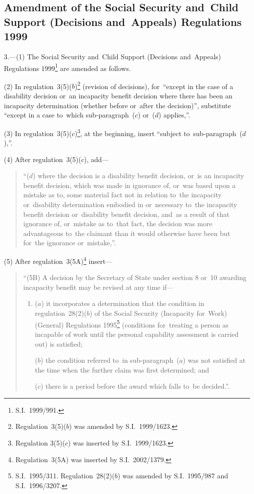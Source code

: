 \documentclass[12pt,a4paper]{article}
\begin{document}
\subsection[3. Amendment of the Social Security and~Child Support (Decisions and~Appeals) Regulations 1999]{Amendment of the Social Security and~Child Support (Decisions and~Appeals) Regulations 1999}

3.---(1)  The Social Security and~Child Support (Decisions and~Appeals) Regulations 1999\footnote{S.I.~1999/991.} are amended as follows.

(2) In regulation~3(5)($b$)\footnote{Regulation~3(5)($b$) was amended by S.I.~1999/1623.} (revision of decisions), for~“except in the case of a disability decision or~an incapacity benefit decision where there has been an incapacity determination (whether before or~after the decision)”, substitute “except in a case to~which sub-paragraph~($c$)  or~($d$)  applies,”.

(3) In regulation~3(5)($c$)\footnote{Regulation 3(5)($c$) was inserted by S.I.~1999/1623.}, at the beginning, insert “subject to~sub-paragraph~($d$),”.

(4) After regulation~3(5)($c$), add—
\begin{quotation}
“($d$) where the decision is a disability benefit decision, or~is an incapacity benefit decision, which was made in ignorance of, or~was based upon a mistake as to, some material fact not in relation to~the incapacity or~disability determination embodied in or~necessary to~the incapacity benefit decision or~disability benefit decision, and~as a result of that ignorance of, or~mistake as to~that fact, the decision was more advantageous to~the claimant than it would otherwise have been but for~the ignorance or~mistake,”.
\end{quotation}

(5) After regulation~3(5A)\footnote{Regulation~3(5A) was inserted by S.I.\ 2002/1379.} insert—
\begin{quotation}
“(5B) A decision by the Secretary of State under section 8 or~10 awarding incapacity benefit may be revised at any time if—
\begin{enumerate}\item[]
($a$) it incorporates a determination that the condition in regulation~28(2)($b$)  of the Social Security (Incapacity for~Work) (General) Regulations 1995\footnote{S.I.~1995/311. Regulation~28(2)($b$) was amended by S.I.~1995/987 and S.I.~1996/3207.} (conditions for~treating a person as incapable of work until the personal capability assessment is carried out) is satisfied;

($b$) the condition referred to~in sub-paragraph~($a$)  was not satisfied at the time when the further claim was first determined; and

($c$) there is a period before the award which falls to~be decided.”.
\end{enumerate}
\end{quotation}
\end{document}
